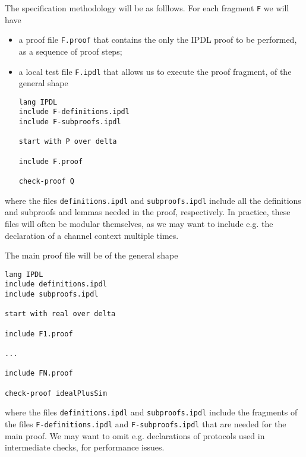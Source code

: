 \documentclass{article}
\begin{document}
The specification methodology will be as folllows.
For each fragment \verb+F+ we will have
\begin{itemize}
\item a proof file \verb+F.proof+ that contains the only the IPDL proof to be performed, as a sequence of proof steps;
\item a local test file \verb+F.ipdl+ that allows us to execute the proof fragment,
of the general shape
\begin{verbatim}
lang IPDL
include F-definitions.ipdl
include F-subproofs.ipdl

start with P over delta

include F.proof

check-proof Q
\end{verbatim}

\end{itemize}
\noindent where the files \verb+definitions.ipdl+
and \verb+subproofs.ipdl+ include all the definitions and subproofs and lemmas
needed in the proof, respectively.
In practice, these files will often be modular themselves, as we may want to include
e.g. the declaration of a channel context multiple times.

The main proof file will be of the general shape

\begin{verbatim}
lang IPDL
include definitions.ipdl
include subproofs.ipdl

start with real over delta

include F1.proof

...

include FN.proof

check-proof idealPlusSim
\end{verbatim}

\noindent where the files \verb+definitions.ipdl+
and \verb+subproofs.ipdl+ include the fragments of the files \verb+F-definitions.ipdl+
and \verb+F-subproofs.ipdl+ that are needed for the main proof. We may want to 
omit e.g. declarations of protocols used in intermediate checks, for performance
issues.
\end{document}
